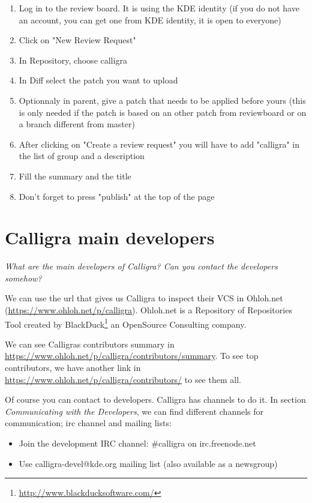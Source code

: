 \documentclass[11pt]{scrartcl}
\begin{document}
\begin{enumerate}
	\item Log in to the review board. It is using the KDE identity (if you do not have an account, you can get one from KDE identity, it is open to everyone)
	\item Click on "New Review Request"
	\item In Repository, choose calligra
	\item In Diff select the patch you want to upload
	\item Optionnaly in parent, give a patch that needs to be applied before yours (this is only needed if the patch is based on an other patch from reviewboard or on a branch different from master)
	\item After clicking on "Create a review request" you will have to add "calligra" in the list of group and a description
	\item Fill the summary and the title
	\item Don't forget to press "publish" at the top of the page
\end{enumerate}

\section{Calligra main developers}
\label{sec:q-03}

\emph{What are the main developers of Calligra? Can you contact the developers somehow?}

\par We can use the url that gives us Calligra to inspect their VCS in Ohloh.net (\url{https://www.ohloh.net/p/calligra}). Ohloh.net is a Repository of Repositories Tool created by BlackDuck\footnote{\url{http://www.blackducksoftware.com/}} an OpenSource Consulting company.

\par We can see Calligras contributors summary in \url{https://www.ohloh.net/p/calligra/contributors/summary}. To see top contributors, we have another link in \url{https://www.ohloh.net/p/calligra/contributors/} to see them all.

\par Of course you can contact to developers. Calligra has channels to do it. In section \emph{Communicating with the Developers}, we can find different channels for communication; irc channel and mailing lists:

\begin{itemize}
	\item Join the development IRC channel: \#calligra on irc.freenode.net
	\item Use calligra-devel@kde.org mailing list (also available as a newsgroup)
\end{itemize}

\end{document}
